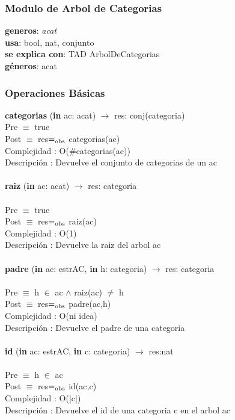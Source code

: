 \documentclass[10pt, a4paper]{article}
\begin{document}
\subsubsection{\Large Modulo de Arbol de Categorias\\}
	\textbf{generos}: \textit{acat}\\
	\textbf{usa}: bool, nat, conjunto\\
		\textbf{se explica con}: TAD ArbolDeCategorias\\
		\textbf{g\'eneros}: acat\\

\subsubsection{\Large Operaciones B\'asicas}
	\textbf{categorias} (\textbf{in} ac: acat) $\longrightarrow$ res: conj(categoria)\\
	Pre $\equiv$ {true}\\
	Post $\equiv$ {res$=_{\mathrm{obs}}$ categorias(ac)}\\
	Complejidad : O($\#$categorias(ac))\\
	Descripci\'{o}n : Devuelve el conjunto de categorias de un ac\\\\
	
	\textbf{raiz} (\textbf{in} ac: acat) $\longrightarrow$ res: categoria\\\\
	Pre $\equiv$ {true}\\
	Post $\equiv$ {res$=_{\mathrm{obs}}$ raiz(ac)}\\
	Complejidad : O(1)\\
	Descripci\'{o}n : Devuelve la raiz del arbol ac\\\\
	
	\textbf{padre} (\textbf{in} ac: estrAC, \textbf{in} h: categoria) $\longrightarrow$ res: categoria\\\\
	Pre $\equiv$ {h $\in$ ac $\wedge$ raiz(ac) $\neq$ h}\\
	Post $\equiv$ {res$=_{\mathrm{obs}}$ padre(ac,h)}\\
	Complejidad : O(ni idea)\\
	Descripci\'{o}n : Devuelve el padre de una categoria\\\\
		
	\textbf{id} (\textbf{in} ac: estrAC, \textbf{in} c: categoria) $\longrightarrow$ res:nat\\\\
	Pre $\equiv$ {h $\in$ ac}\\
	Post $\equiv$ {res$=_{\mathrm{obs}}$ id(ac,c)}\\
	Complejidad : O(|c|)\\
	Descripci\'{o}n : Devuelve el id de una categoria c en el arbol ac\\\\	
	
\end{document}
